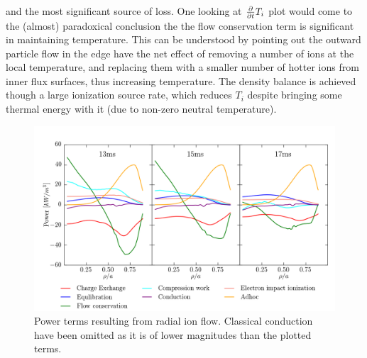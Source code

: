 and the most significant source of loss. One looking at $\frac{\partial}{\partial t} T_i$ plot would come to the (almost) paradoxical conclusion the the flow conservation term is significant in maintaining temperature. This can be understood by pointing out the outward particle flow in the edge have the net effect of removing a number of ions at the local temperature, and replacing them with a smaller number of hotter ions from inner flux surfaces, thus increasing temperature. The density balance is achieved though a large ionization source rate, which reduces $T_i$ despite bringing some thermal energy with it (due to non-zero neutral temperature).


\begin{figure}
    \centering
    \includegraphics[width = \textwidth]{ion_transport_results/power_terms_with_adhoc.png}
    \caption[Power terms resulting from radial ion flow]{Power terms resulting from radial ion flow. Classical conduction have been omitted as it is of lower magnitudes than the plotted terms.}
    \label{fig:power_terms_with_adhoc}
\end{figure}



